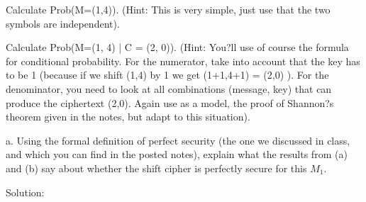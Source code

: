 \documentclass[12pt,letterpaper,final]{report}
\begin{document}
\bigskip
{}
\begin{alphalist}
	\item Calculate Prob(M=(1,4)). (Hint: This is very simple, just use that the two symbols are independent).
	\item Calculate Prob(M=(1, 4) | C = (2, 0)). (Hint: You?ll use of course the formula for conditional probability. For the numerator, take into account that the key has to be 1 (because if we shift (1,4) by 1 we get (1+1,4+1) = (2,0) ). For the denominator, you need to look at all combinations (message, key) that can produce the ciphertext (2,0).  Again use as a model, the proof of Shannon?s theorem given in the notes, but adapt to this situation).
	\item a.	Using the formal definition of perfect security (the one we discussed in class, and which you can find in the posted notes), explain what the results from (a) and (b) say about whether the shift cipher is perfectly secure for this $M_{1}$.
\end{alphalist}


\bigskip Solution: 
\bigskip
\end{document}
